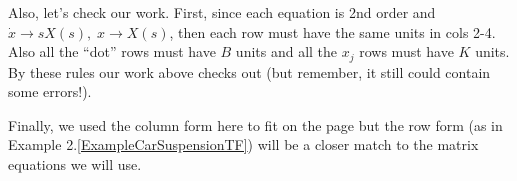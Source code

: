 Also, let's check our work.   First, since each equation is 2nd order
and $\dot{x} \to sX(s), \; x \to X(s)$, then each row must have the same
units in cols 2-4.   Also all the ``dot'' rows must have $B$ units
and all the $x_j$ rows must have $K$ units.   By these rules  our work
above checks out (but remember, it still could contain some errors!).

Finally,  we used the column form here
to fit on the page but the row form (as in Example
2.\ref{ExampleCarSuspensionTF}) will be a closer match to the matrix equations
we will use.
